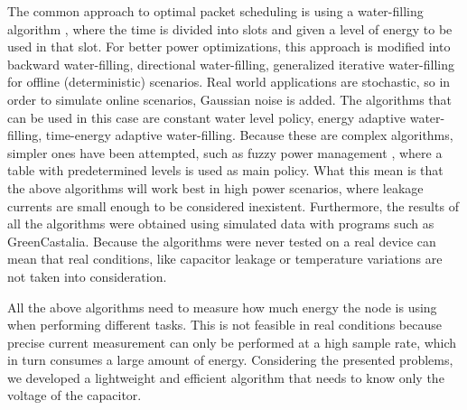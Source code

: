 The common approach to optimal packet scheduling is using a water-filling algorithm
\cite{yang2012optimal}\cite{huang2013utility}, where the time
is divided into slots and given a level of energy to be used in that slot. For better power
optimizations, this approach is modified into backward water-filling, directional water-filling,
generalized iterative water-filling \cite{wang2015iterative} for offline (deterministic) scenarios.
Real world applications are stochastic, so in order to simulate online scenarios, Gaussian noise is
added. The algorithms that can be used in this case are constant water level policy, energy
adaptive water-filling\cite{ozel2012optimal}, time-energy adaptive
water-filling\cite{ozel2011transmission}.
Because these are complex algorithms, simpler ones have been attempted, such as fuzzy power
management\cite{aoudia2016fuzzy} , where a table with predetermined levels is used as main policy.
What this mean is that the above algorithms will work best in high power scenarios, where leakage
currents are small enough to be considered inexistent. Furthermore, the results of all the
algorithms were obtained using simulated data with programs such as
GreenCastalia\cite{benedetti2013greencastalia}. Because the algorithms were never tested on a
real device can mean that real conditions, like capacitor leakage or temperature variations are not taken into consideration.

All the above algorithms need to measure how much energy the node is using when performing
different tasks. This is not feasible in real conditions because precise current measurement can only be
performed at a high sample rate, which in turn consumes a large amount of energy. Considering the
presented problems, we developed a lightweight and efficient algorithm that needs to know only the
voltage of the capacitor.

